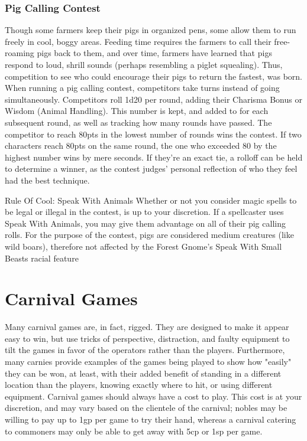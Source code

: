 \documentclass[10pt,a4paper,twoside,twocolumn,openany,bg=print,nodeprecatedcode]{dndbook}
\begin{document}
\subsection{Pig Calling Contest}
Though some farmers keep their pigs in organized pens, some allow them to run freely in cool, boggy areas. Feeding time requires the farmers to call their free-roaming pigs back to them, and over time, farmers have learned that pigs respond to loud, shrill sounds (perhaps resembling a piglet squealing). Thus, competition to see who could encourage their pigs to return the fastest, was born.
When running a pig calling contest, competitors take turns instead of going simultaneously. Competitors roll 1d20 per round, adding their Charisma Bonus or Wisdom (Animal Handling). This number is kept, and added to for each subsequent round, as well as tracking how many rounds have passed. The competitor to reach 80pts in the lowest number of rounds wins the contest. If two characters reach 80pts on the same round, the one who exceeded 80 by the highest number wins by mere seconds. If they're an exact tie, a rolloff can be held to determine a winner, as the contest judges' personal reflection of who they feel had the best technique.
\begin{DndComment}{Rule Of Cool: Speak With Animals}
Whether or not you consider magic spells to be legal or illegal in the contest, is up to your discretion. If a spellcaster uses Speak With Animals, you may give them advantage on all of their pig calling rolls. For the purpose of the contest, pigs are considered medium creatures (like wild boars), therefore not affected by the Forest Gnome's Speak With Small Beasts racial feature
\end{DndComment}

\chapter{Carnival Games}
Many carnival games are, in fact, rigged. They are designed to make it appear easy to win, but use tricks of perspective, distraction, and faulty equipment to tilt the games in favor of the operators rather than the players. Furthermore, many carnies provide examples of the games being played to show how "easily" they can be won, at least, with their added benefit of standing in a different location than the players, knowing exactly where to hit, or using different equipment.
Carnival games should always have a cost to play. This cost is at your discretion, and may vary based on the clientele of the carnival; nobles may be willing to pay up to 1gp per game to try their hand, whereas a carnival catering to commoners may only be able to get away with 5cp or 1sp per game.
\end{document}
